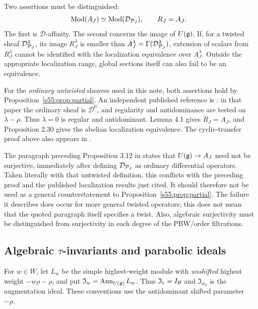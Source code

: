 \begin{rk}
\label{s55:rem:localization-scope}
Two assertions must be distinguished:
\[
 \operatorname{Mod}(A_J)
   \simeq\operatorname{Mod}(\mathcal D_{\mathcal{P}_J}),
 \qquad
 R_J=A_J.
\]
The first is $\mathcal D$-affinity. The second concerns the image of
$U(\mathfrak{g})$. If, for a twisted sheaf $\mathcal D^\lambda_{\mathcal{P}_J}$, its image
$R_J^\lambda$ is smaller than
$A_J^\lambda=\Gamma(\mathcal D^\lambda_{\mathcal{P}_J})$, extension of scalars from
$R_J^\lambda$ cannot be identified with the localization equivalence over
$A_J^\lambda$. Outside the appropriate localization range, global sections
itself can also fail to be an equivalence.

For the \emph{ordinary untwisted} sheaves used in this note, both assertions
hold by Proposition~\ref{s55:prop:partial}. An independent published reference
is \cite[Section 2.3.1, Definition 2.24, Proposition 2.30, and Lemma 4.1]{Yahiro17}:
in that paper the ordinary sheaf is $\mathcal D^0$, and regularity and
antidominance are tested on $\lambda-\rho$. Thus $\lambda=0$ is regular
and antidominant. Lemma 4.1 gives $R_J=A_J$, and Proposition 2.30 gives
the abelian localization equivalence. The cyclic-transfer proof above
also appears in \cite[Chapter I, Proposition 5.6]{Bien90}.

The paragraph preceding Proposition 3.12 in \cite{CNT08} states that
$U(\mathfrak{g})\to A_J$ need not be surjective, immediately after defining
$\mathcal D_{\mathcal{P}_J}$ as ordinary differential operators. Taken literally
with that untwisted definition, this conflicts with the preceding proof
and the published localization results just cited. It should therefore
not be used as a general counterstatement to Proposition~\ref{s55:prop:partial}.
The failure it describes does occur for more general twisted operators;
this does not mean that the quoted paragraph itself specifies a twist.
Also, algebraic surjectivity must be distinguished from surjectivity in
each degree of the PBW/order filtrations.
\end{rk}

\subsection{Algebraic \texorpdfstring{$\tau$}{tau}-invariants and parabolic ideals}
\label{s55:subsec:algebraic}

For $w\in W$, let $L_w$ be the simple highest-weight module with
\emph{unshifted} highest weight $-w\rho-\rho$, and put
$\mathfrak I_w=\operatorname{Ann}_{U(\mathfrak{g})}L_w$.
Thus $\mathfrak I_e=I_{\mathcal{B}}$ and $\mathfrak I_{w_0}$ is the augmentation
ideal. These conventions use the antidominant shifted parameter $-\rho$.

